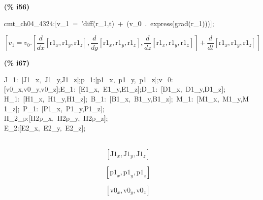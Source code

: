 \documentclass[fleqn]{article}
\begin{document}
\noindent
\begin{minipage}[t]{4.000000em}\color{red}\bfseries
(\% i56)	
\end{minipage}
\begin{minipage}[t]{\textwidth}\color{blue}
cmt\_ch04\_4324:[v\_1\ =\ 'diff(r\_1,t)\ +\ (v\_0\ .\ express(grad(r\_1)))];
\end{minipage}
\[\displaystyle \tag{\% o56} 
\left[ {v_1}={v_0}\ensuremath{\mathrm{ . }}\left[ \frac{d}{d x} \left[ {{\ensuremath{\mathrm{r1}}}_x}\operatorname{,}{{\ensuremath{\mathrm{r1}}}_y}\operatorname{,}{{\ensuremath{\mathrm{r1}}}_z}\right] \operatorname{,}\frac{d}{d y} \left[ {{\ensuremath{\mathrm{r1}}}_x}\operatorname{,}{{\ensuremath{\mathrm{r1}}}_y}\operatorname{,}{{\ensuremath{\mathrm{r1}}}_z}\right] \operatorname{,}\frac{d}{d z} \left[ {{\ensuremath{\mathrm{r1}}}_x}\operatorname{,}{{\ensuremath{\mathrm{r1}}}_y}\operatorname{,}{{\ensuremath{\mathrm{r1}}}_z}\right] \right] +\frac{d}{d t} \left[ {{\ensuremath{\mathrm{r1}}}_x}\operatorname{,}{{\ensuremath{\mathrm{r1}}}_y}\operatorname{,}{{\ensuremath{\mathrm{r1}}}_z}\right] \right] \mbox{}
\]


\noindent
\begin{minipage}[t]{4.000000em}\color{red}\bfseries
(\% i67)	
\end{minipage}
\begin{minipage}[t]{\textwidth}\color{blue}
J\_1:\ [J1\_x,\ J1\_y,J1\_z];p\_1:[p1\_x,\ p1\_y,\ p1\_z];v\_0:[v0\_x,v0\_y,v0\_z];E\_1:\ [E1\_x,\ E1\_y,E1\_z];D\_1:\ [D1\_x,\ D1\_y,D1\_z];\\
H\_1:\ [H1\_x,\ H1\_y,H1\_z];\ B\_1:\ [B1\_x,\ B1\_y,B1\_z];\ M\_1:\ [M1\_x,\ M1\_y,M1\_z];\ P\_1:\ [P1\_x,\ P1\_y,P1\_z];\\
H\_2\_p:[H2p\_x,\ H2p\_y,\ H2p\_z];\\
E\_2:[E2\_x,\ E2\_y,\ E2\_z];\\
\\

\end{minipage}
\[\displaystyle \tag{\% o57} 
\left[ {{\ensuremath{\mathrm{J1}}}_x}\operatorname{,}{{\ensuremath{\mathrm{J1}}}_y}\operatorname{,}{{\ensuremath{\mathrm{J1}}}_z}\right] \mbox{}\]

\[\tag{\% o58} 
\left[ {{\ensuremath{\mathrm{p1}}}_x}\operatorname{,}{{\ensuremath{\mathrm{p1}}}_y}\operatorname{,}{{\ensuremath{\mathrm{p1}}}_z}\right] \mbox{}\]

\[\tag{\% o59} 
\left[ {{\ensuremath{\mathrm{v0}}}_x}\operatorname{,}{{\ensuremath{\mathrm{v0}}}_y}\operatorname{,}{{\ensuremath{\mathrm{v0}}}_z}\right] \mbox{}\]
\end{document}
